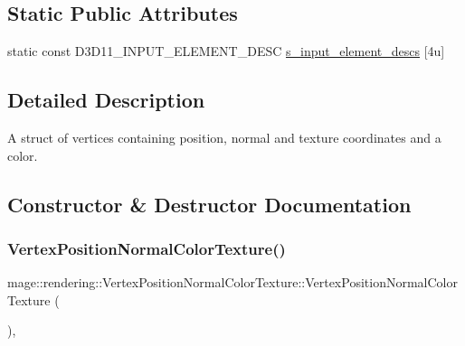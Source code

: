 \subsection*{Static Public Attributes}
\begin{DoxyCompactItemize}
\item 
static const D3\+D11\+\_\+\+I\+N\+P\+U\+T\+\_\+\+E\+L\+E\+M\+E\+N\+T\+\_\+\+D\+E\+SC \mbox{\hyperlink{structmage_1_1rendering_1_1_vertex_position_normal_color_texture_afb6520a849586814eb01861f3b46627d}{s\+\_\+input\+\_\+element\+\_\+descs}} \mbox{[}4u\mbox{]}
\end{DoxyCompactItemize}


\subsection{Detailed Description}
A struct of vertices containing position, normal and texture coordinates and a color. 

\subsection{Constructor \& Destructor Documentation}
\mbox{\label{structmage_1_1rendering_1_1_vertex_position_normal_color_texture_a9655643724642a5d4a3f5baf85340412}} 
\subsubsection{\texorpdfstring{Vertex\+Position\+Normal\+Color\+Texture()}{VertexPositionNormalColorTexture()}\hspace{0.1cm}{\footnotesize\ttfamily [1/4]}}
{\footnotesize\ttfamily mage\+::rendering\+::\+Vertex\+Position\+Normal\+Color\+Texture\+::\+Vertex\+Position\+Normal\+Color\+Texture (\begin{DoxyParamCaption}{ }\end{DoxyParamCaption})\hspace{0.3cm}{\ttfamily [default]}, {\ttfamily [noexcept]}}

